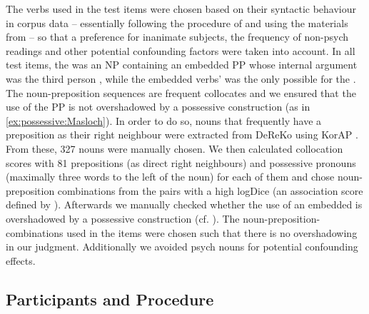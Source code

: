 \documentclass[output=paper,colorlinks,citecolor=brown]{langscibook}
\begin{document}
The verbs used in the test items were chosen based on their syntactic behaviour in corpus data -- essentially following the procedure of and using the materials from \textcite{masloch_not_2024} -- so that a preference for inanimate subjects, the frequency of non-psych readings and other potential confounding factors were taken into account. 
In all test items, the  was an NP containing an embedded PP whose internal argument was the third person  , while the embedded verbs'  was the only possible  for the .
The noun-preposition sequences are frequent collocates and we ensured that the use of the PP is not overshadowed by a possessive construction (as in \ref{ex:possessive:Masloch}).
In order to do so, nouns that frequently have a preposition as their right neighbour were extracted from DeReKo \parencite{kupietz_German_2010} using KorAP \parencite{diewald_korap_2016}.
From these, 327 nouns were manually chosen. We then calculated collocation scores with 81 prepositions (as direct right neighbours) and possessive pronouns (maximally three words to the left of the noun) for each of them and
chose noun-preposition combinations from the pairs with a high logDice (an association score defined by \citealt{rychly_lexicographer_2008}). Afterwards we manually checked whether the use of an embedded  is overshadowed by a possessive construction (cf. ).
The noun-preposition- combinations used in the items were chosen such that there is no overshadowing in our judgment.
Additionally we avoided psych nouns for potential confounding effects.

\subsection{Participants and Procedure}
\label{sec:procedure:Masloch}
  
\end{document}
